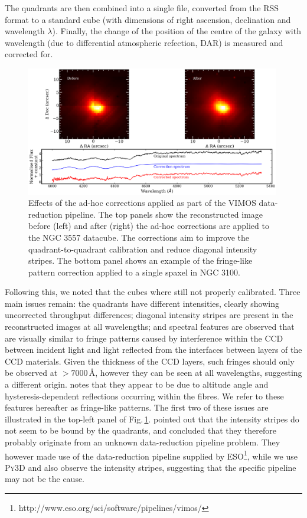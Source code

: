 		The quadrants are then combined into a single file, converted from the RSS format to a standard cube (with dimensions of right ascension, declination and wavelength $\lambda$). Finally, the change of the position of the centre of the galaxy with wavelength (due to differential atmospheric refection, DAR) is measured and corrected for. 

		\begin{figure}
			\centering
			\includegraphics[width=0.99\textwidth]{chapter2/corr_image.png}
			\caption[Ad-hoc correction to the VIMOS datacubes]{Effects of the ad-hoc corrections applied as part of the VIMOS data-reduction pipeline. The top panels show the reconstructed image before (left) and after (right) the ad-hoc corrections are applied to the NGC 3557 datacube. The corrections aim to improve the quadrant-to-quadrant calibration and reduce diagonal intensity stripes. The bottom panel shows an example of the fringe-like pattern correction applied to a single spaxel in NGC 3100.}
			\label{fig:Correction}
		\end{figure}

		Following this, we noted that the cubes where still not properly calibrated. Three main issues remain: the quadrants have different intensities, clearly showing uncorrected throughput differences; diagonal intensity stripes are present in the reconstructed images at all wavelengths; and spectral features are observed \citep{Jullo2008} that are visually similar to fringe patterns caused by interference within the CCD between incident light and light reflected from the interfaces between layers of the CCD materials. Given the thickness of the CCD layers, such fringes should only be observed at $>7000$\,\AA, however they can be seen at all wavelengths, suggesting a different origin. \citet{Lagerholm2012} notes that they appear to be due to altitude angle and hysteresis-dependent reflections occurring within the fibres. We refer to these features hereafter as fringe-like patterns. The first two of these issues are illustrated in the top-left panel of Fig.\,\ref{fig:Correction}. \citet{Lagerholm2012} pointed out that the intensity stripes do not seem to be bound by the quadrants, and concluded that they therefore probably originate from an unknown data-reduction pipeline problem. They however made use of the data-reduction pipeline supplied by ESO\footnote{http://www.eso.org/sci/software/pipelines/vimos/}, while we use \textsc{Py3D} and also observe the intensity stripes, suggesting that the specific pipeline may not be the cause.  

